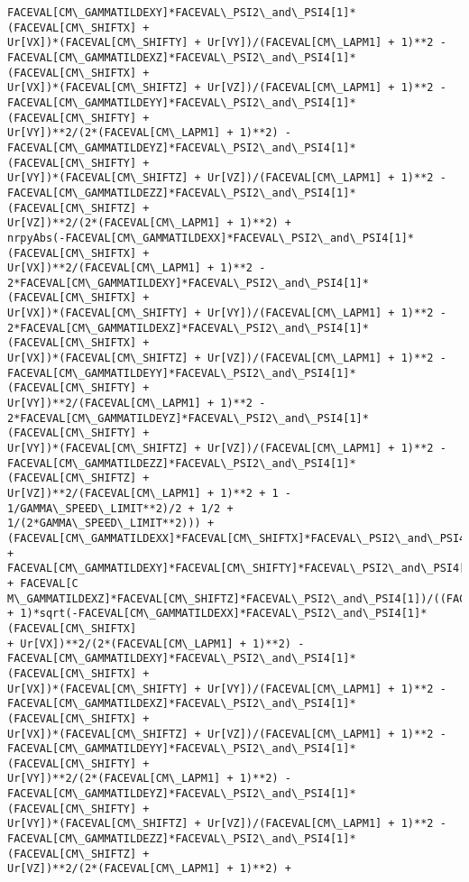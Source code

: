 \documentclass[landscape,letterpaper,10pt,english]{article}
\begin{document}
\begin{Verbatim}[commandchars=\\\{\}]
FACEVAL[CM\_GAMMATILDEXY]*FACEVAL\_PSI2\_and\_PSI4[1]*(FACEVAL[CM\_SHIFTX] +
Ur[VX])*(FACEVAL[CM\_SHIFTY] + Ur[VY])/(FACEVAL[CM\_LAPM1] + 1)**2 -
FACEVAL[CM\_GAMMATILDEXZ]*FACEVAL\_PSI2\_and\_PSI4[1]*(FACEVAL[CM\_SHIFTX] +
Ur[VX])*(FACEVAL[CM\_SHIFTZ] + Ur[VZ])/(FACEVAL[CM\_LAPM1] + 1)**2 -
FACEVAL[CM\_GAMMATILDEYY]*FACEVAL\_PSI2\_and\_PSI4[1]*(FACEVAL[CM\_SHIFTY] +
Ur[VY])**2/(2*(FACEVAL[CM\_LAPM1] + 1)**2) -
FACEVAL[CM\_GAMMATILDEYZ]*FACEVAL\_PSI2\_and\_PSI4[1]*(FACEVAL[CM\_SHIFTY] +
Ur[VY])*(FACEVAL[CM\_SHIFTZ] + Ur[VZ])/(FACEVAL[CM\_LAPM1] + 1)**2 -
FACEVAL[CM\_GAMMATILDEZZ]*FACEVAL\_PSI2\_and\_PSI4[1]*(FACEVAL[CM\_SHIFTZ] +
Ur[VZ])**2/(2*(FACEVAL[CM\_LAPM1] + 1)**2) +
nrpyAbs(-FACEVAL[CM\_GAMMATILDEXX]*FACEVAL\_PSI2\_and\_PSI4[1]*(FACEVAL[CM\_SHIFTX] +
Ur[VX])**2/(FACEVAL[CM\_LAPM1] + 1)**2 -
2*FACEVAL[CM\_GAMMATILDEXY]*FACEVAL\_PSI2\_and\_PSI4[1]*(FACEVAL[CM\_SHIFTX] +
Ur[VX])*(FACEVAL[CM\_SHIFTY] + Ur[VY])/(FACEVAL[CM\_LAPM1] + 1)**2 -
2*FACEVAL[CM\_GAMMATILDEXZ]*FACEVAL\_PSI2\_and\_PSI4[1]*(FACEVAL[CM\_SHIFTX] +
Ur[VX])*(FACEVAL[CM\_SHIFTZ] + Ur[VZ])/(FACEVAL[CM\_LAPM1] + 1)**2 -
FACEVAL[CM\_GAMMATILDEYY]*FACEVAL\_PSI2\_and\_PSI4[1]*(FACEVAL[CM\_SHIFTY] +
Ur[VY])**2/(FACEVAL[CM\_LAPM1] + 1)**2 -
2*FACEVAL[CM\_GAMMATILDEYZ]*FACEVAL\_PSI2\_and\_PSI4[1]*(FACEVAL[CM\_SHIFTY] +
Ur[VY])*(FACEVAL[CM\_SHIFTZ] + Ur[VZ])/(FACEVAL[CM\_LAPM1] + 1)**2 -
FACEVAL[CM\_GAMMATILDEZZ]*FACEVAL\_PSI2\_and\_PSI4[1]*(FACEVAL[CM\_SHIFTZ] +
Ur[VZ])**2/(FACEVAL[CM\_LAPM1] + 1)**2 + 1 - 1/GAMMA\_SPEED\_LIMIT**2)/2 + 1/2 +
1/(2*GAMMA\_SPEED\_LIMIT**2))) +
(FACEVAL[CM\_GAMMATILDEXX]*FACEVAL[CM\_SHIFTX]*FACEVAL\_PSI2\_and\_PSI4[1] +
FACEVAL[CM\_GAMMATILDEXY]*FACEVAL[CM\_SHIFTY]*FACEVAL\_PSI2\_and\_PSI4[1] + FACEVAL[C
M\_GAMMATILDEXZ]*FACEVAL[CM\_SHIFTZ]*FACEVAL\_PSI2\_and\_PSI4[1])/((FACEVAL[CM\_LAPM1]
+ 1)*sqrt(-FACEVAL[CM\_GAMMATILDEXX]*FACEVAL\_PSI2\_and\_PSI4[1]*(FACEVAL[CM\_SHIFTX]
+ Ur[VX])**2/(2*(FACEVAL[CM\_LAPM1] + 1)**2) -
FACEVAL[CM\_GAMMATILDEXY]*FACEVAL\_PSI2\_and\_PSI4[1]*(FACEVAL[CM\_SHIFTX] +
Ur[VX])*(FACEVAL[CM\_SHIFTY] + Ur[VY])/(FACEVAL[CM\_LAPM1] + 1)**2 -
FACEVAL[CM\_GAMMATILDEXZ]*FACEVAL\_PSI2\_and\_PSI4[1]*(FACEVAL[CM\_SHIFTX] +
Ur[VX])*(FACEVAL[CM\_SHIFTZ] + Ur[VZ])/(FACEVAL[CM\_LAPM1] + 1)**2 -
FACEVAL[CM\_GAMMATILDEYY]*FACEVAL\_PSI2\_and\_PSI4[1]*(FACEVAL[CM\_SHIFTY] +
Ur[VY])**2/(2*(FACEVAL[CM\_LAPM1] + 1)**2) -
FACEVAL[CM\_GAMMATILDEYZ]*FACEVAL\_PSI2\_and\_PSI4[1]*(FACEVAL[CM\_SHIFTY] +
Ur[VY])*(FACEVAL[CM\_SHIFTZ] + Ur[VZ])/(FACEVAL[CM\_LAPM1] + 1)**2 -
FACEVAL[CM\_GAMMATILDEZZ]*FACEVAL\_PSI2\_and\_PSI4[1]*(FACEVAL[CM\_SHIFTZ] +
Ur[VZ])**2/(2*(FACEVAL[CM\_LAPM1] + 1)**2) +

\end{Verbatim}
\end{document}
